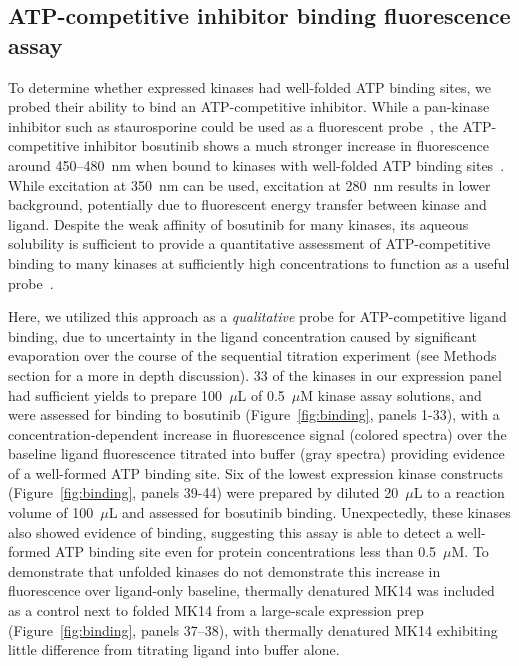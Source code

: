 \documentclass[phd,tocprelim]{cornell}
\begin{document}
\subsection{ATP-competitive inhibitor binding fluorescence assay}
To determine whether expressed kinases had well-folded ATP binding sites, we probed their ability to bind an ATP-competitive inhibitor.
While a pan-kinase inhibitor such as staurosporine could be used as a fluorescent probe~\citep{Iyer:2008is}, the ATP-competitive inhibitor bosutinib shows a much stronger increase in fluorescence around 450--480~nm when bound to kinases with well-folded ATP binding sites~\cite{levinson-boxer:plos-one:2012:bosutinib,Levinson:2014gi}. 
While excitation at 350~nm can be used, excitation at 280~nm results in lower background, potentially due to fluorescent energy transfer between kinase and ligand.
Despite the weak affinity of bosutinib for many kinases, its aqueous solubility is sufficient to provide a quantitative assessment of ATP-competitive binding to many kinases at sufficiently high concentrations to function as a useful probe~\cite{levinson-boxer:plos-one:2012:bosutinib,Levinson:2014gi}.

Here, we utilized this approach as a \emph{qualitative} probe for ATP-competitive ligand binding, due to uncertainty in the ligand concentration caused by significant evaporation over the course of the sequential titration experiment (see Methods section for a more in depth discussion). 
33 of the kinases in our expression panel had sufficient yields to prepare 100~$\mu$L of 0.5~$\mu$M kinase assay solutions, and were assessed for binding to bosutinib (Figure~\ref{fig:binding}, panels 1-33), with a concentration-dependent increase in fluorescence signal (colored spectra) over the baseline ligand fluorescence titrated into buffer (gray spectra) providing evidence of a well-formed ATP binding site. 
Six of the lowest expression kinase constructs (Figure~\ref{fig:binding}, panels 39-44) were prepared by diluted 20~$\mu$L to a reaction volume of 100~$\mu$L and assessed for bosutinib binding. Unexpectedly, these kinases also showed evidence of binding, suggesting this assay is able to detect a well-formed ATP binding site even for protein concentrations less than 0.5~$\mu$M. 
To demonstrate that unfolded kinases do not demonstrate this increase in fluorescence over ligand-only baseline, thermally denatured MK14 was included as a control next to folded MK14 from a large-scale expression prep (Figure~\ref{fig:binding}, panels 37--38), with thermally denatured MK14 exhibiting little difference from titrating ligand into buffer alone. 
\end{document}
